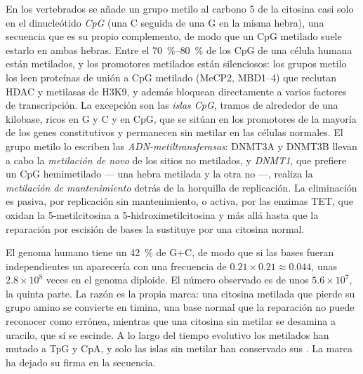 \begin{definition}\label{def:b3:chromatin-epigenetics:methylation}
En los vertebrados se añade un grupo metilo al carbono 5 de la citosina
casi solo en el dinucleótido \emph{CpG} (una C seguida de una G en la
misma hebra), una secuencia que es su propio complemento, de modo que un
CpG metilado suele estarlo en ambas hebras. Entre el
\qtyrange{70}{80}{\%} de los CpG de una célula humana están metilados, y
los promotores metilados están silenciosos: los grupos metilo los leen
proteínas de unión a CpG metilado (MeCP2, MBD1--4) que reclutan HDAC y
metilasas de H3K9, y además bloquean directamente a varios factores de
transcripción. La excepción son las \emph{islas CpG}, tramos de alrededor
de una kilobase, ricos en G y C y en CpG, que se sitúan en los promotores
de la mayoría de los genes constitutivos y permanecen sin metilar en las
células normales. El grupo metilo lo escriben las
\emph{ADN-metiltransferasas}: DNMT3A y DNMT3B llevan a cabo la
\emph{metilación de novo} de los sitios no metilados, y \emph{DNMT1}, que
prefiere un CpG hemimetilado --- una hebra metilada y la otra no ---,
realiza la \emph{metilación de mantenimiento} detrás de la horquilla de
replicación. La eliminación es pasiva, por replicación sin mantenimiento,
o activa, por las enzimas TET, que oxidan la 5-metilcitosina a
5-hidroximetilcitosina y más allá hasta que la reparación por escisión de
bases la sustituye por una citosina normal.
\end{definition}

\begin{example}\label{ex:b3:chromatin-epigenetics:cpg-deficit}
El genoma humano tiene un \qty{42}{\%} de G$+$C, de modo que si las bases
fueran independientes un  aparecería con una frecuencia de
$0.21\times 0.21 \approx 0.044$, unas $2.8\times 10^{8}$ veces en el
genoma diploide. El
número observado es de unos $5.6\times 10^{7}$, la quinta parte. La razón
es la propia marca: una citosina metilada que pierde su grupo amino se
convierte en timina, una base normal que la reparación no puede
reconocer como errónea, mientras que una citosina sin metilar se desamina
a uracilo, que sí se escinde. A lo largo del tiempo evolutivo los 
metilados han mutado a TpG y CpA, y solo las islas sin metilar han
conservado sus . La marca ha dejado su firma en la secuencia.
\end{example}

